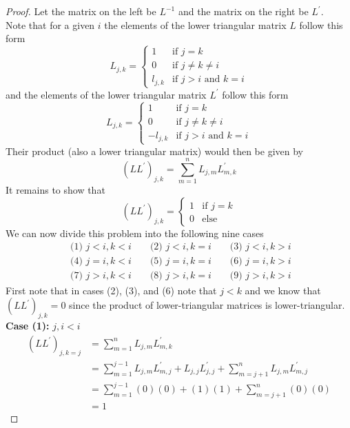 \documentclass[12pt]{article}
\begin{document}
	\begin{proof}Let the matrix on the left be $L^{-1}$ and the matrix on the right be $L^\prime$. \\
		Note that for a given $i$ the elements of the lower triangular matrix $L$ follow this form
		$$
		L_{j,k} =
		\begin{cases}
			1 & \text{if } j=k \\
			0 & \text{if } j \neq k \neq i \\
			l_{j,k} & \text{if } j > i \text{ and } k = i
		\end{cases}
		$$
		and the elements of the lower triangular matrix $L^\prime$ follow this form
		$$
		L_{j,k} =
		\begin{cases}
		1 & \text{if } j=k \\
		0 & \text{if } j \neq k \neq i \\
		-l_{j,k} & \text{if } j > i \text{ and } k = i
		\end{cases}
		$$
		Their product (also a lower triangular matrix) would then be given by
		$$
		(LL^\prime)_{j,k} = \sum\limits_{m=1}^n L_{j,m}L^\prime_{m,k}
		$$
		It remains to show that
		$$
		(LL^\prime)_{j,k} =
		\begin{cases}
			1 & \text{if } j=k \\
			0 & \text{else}
		\end{cases}
		$$
		We can now divide this problem into the following nine cases
		\begin{align*}
			\text{ (1) } j<i, k < i && \text{ (2) } j<i, k=i && \text{ (3) } j<i, k>i \\
			\text{ (4) } j=i, k < i && \text{ (5) } j=i, k=i && \text{ (6) } j=i, k>i \\
			\text{ (7) } j>i, k < i && \text{ (8) } j>i, k=i && \text{ (9) } j>i, k>i
		\end{align*}
		First note that in cases (2), (3), and (6) note that $j<k$ and we know that $(LL^\prime)_{j,k} = 0$ since the product of lower-triangular matrices is lower-triangular.
		\textbf{Case (1):} $j,i<i$
		\begin{align*}
			(LL^\prime)_{j,k=j} & = \sum\limits_{m=1}^n L_{j,m}L^\prime_{m,k} \\
			& = \sum\limits_{m=1}^{j-1} L_{j,m}L^\prime_{m,j} + L_{j,j}L^\prime_{j,j} + \sum\limits_{m=j+1}^n L_{j,m}L^\prime_{m,j} \\
			& = \sum\limits_{m=1}^{j-1} (0)(0) + (1)(1) + \sum\limits_{m=j+1}^n (0)(0) \\
			& = 1
		\end{align*}

\end{proof}
\end{document}
